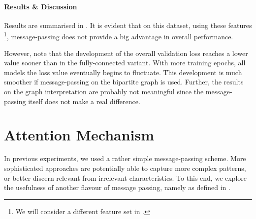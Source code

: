 \documentclass[
	fontsize=10pt, %
	twoside=false, %
	secnumdepth=1, %
  toc=indentunnumbered %
]{kaobook}
\begin{document}
\paragraph{Results \& Discussion} Results are summarised in
. It is evident that on this dataset,
using these features \footnote{ We will consider a different feature set in
  . }, message-passing does not provide a big
advantage in overall performance.

However, note that the development of the overall validation loss reaches a
lower value sooner than in the fully-connected variant. With more training
epochs, all models the loss value eventually begins to fluctuate. This
development is much smoother if message-passing on the bipartite graph is used.
Further, the results on the graph interpretation are probably not meaningful
since the message-passing itself does not make a real difference.






\section{Attention Mechanism}

In previous experiments, we used a rather simple message-passing scheme. More
sophisticated approaches are potentially able to capture more complex patterns,
or better discern relevant from irrelevant characteristics. To this end, we
explore the usefulness of another flavour of message passing, namely  as defined in .


\end{document}
